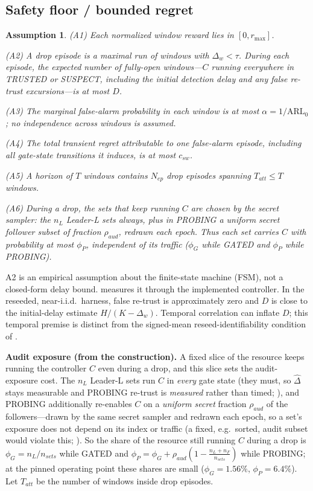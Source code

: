 \documentclass{article}
\newtheorem{assumption}{Assumption}
\newcommand{\dhat}{\hat{\Delta}}
\newcommand{\rmax}{r_{\max}}
\begin{document}
\subsection{Safety floor / bounded regret}
\begin{assumption}\label{asm}
\textup{(A1)} Each normalized window reward lies in $[0,\rmax]$.

\textup{(A2)} A \emph{drop episode} is a maximal run of windows with
$\Delta_w<\tau$. During each episode, the expected number of \emph{fully-open}
windows---$C$ running everywhere in TRUSTED or SUSPECT, including the initial
detection delay and any false re-trust excursions---is at most $D$.

\textup{(A3)} The marginal false-alarm probability in each window is at most
$\alpha=1/\mathrm{ARL}_0$; no independence across windows is assumed.

\textup{(A4)} The total transient regret attributable to one false-alarm episode,
including all gate-state transitions it induces, is at most $c_{sw}$.

\textup{(A5)} A horizon of $T$ windows contains $N_{ep}$ drop episodes spanning
$T_{att}\le T$ windows.

\textup{(A6)} During a drop, the sets that keep running $C$ are chosen by the
secret sampler: the $n_L$ Leader-L sets always, plus in PROBING a uniform secret
follower subset of fraction $\rho_{aud}$, redrawn each epoch. Thus each set carries
$C$ with probability at most $\phi_P$, independent of its traffic ($\phi_G$ while
GATED and $\phi_P$ while PROBING).
\end{assumption}

A2 is an empirical assumption about the finite-state machine (FSM), not a
closed-form delay bound.  measures it through the implemented
controller. In the reseeded, near-i.i.d.\ harness, false re-trust is approximately
zero and $D$ is close to the initial-delay estimate $H/(K-\Delta_w)$. Temporal
correlation can inflate $D$; this temporal premise is distinct from the signed-mean
reseed-identifiability condition of .

\textbf{Audit exposure (from the construction).} A fixed slice of the resource keeps running the controller $C$ even during a drop, and this slice sets the audit-exposure cost. The $n_L$ Leader-L sets run $C$ in
\emph{every} gate state (they must, so $\dhat$ stays measurable and PROBING re-trust is
\emph{measured} rather than timed; ), and PROBING additionally re-enables
$C$ on a \emph{uniform secret} fraction $\rho_{aud}$ of the followers---drawn by the same secret
sampler and redrawn each epoch, so a set's exposure does not depend on its index or traffic
(a fixed, e.g.\ sorted, audit subset would violate this; ). So the share of the resource still running
$C$ during a drop is $\phi_G=n_L/n_{sets}$ while GATED and
$\phi_P=\phi_G+\rho_{aud}\!\left(1-\tfrac{n_L+n_F}{n_{sets}}\right)$ while PROBING; at the pinned operating point these shares are small ($\phi_G{=}1.56\%$, $\phi_P{=}6.4\%$). Let $T_{att}$ be the
number of windows inside drop episodes.
\end{document}
